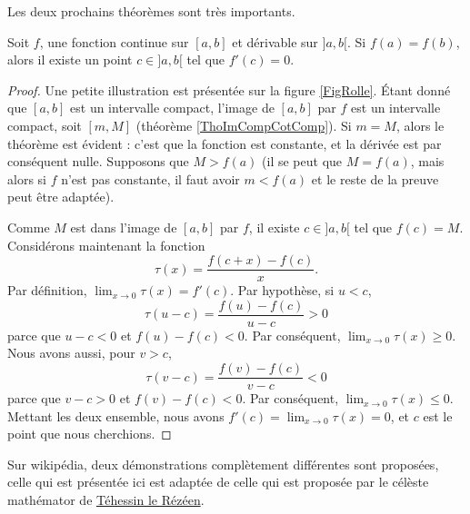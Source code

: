 Les deux prochains théorèmes sont très importants.
\begin{theorem}		\label{ThoRolle}
	Soit $f$, une fonction continue sur $[a,b]$ et dérivable sur $]a,b[$. Si $f(a)=f(b)$, alors il existe un point $c\in]a,b[$ tel que $f'(c)=0$.
\end{theorem}
\newcommand{\CaptionRolle}{Illustration du théorème de Rolle. Nous avons $f(a)=f(b)$, et effectivement, au point $c$, la tangente est horizonale (dérivée nulle).}


\begin{proof}
	Une petite illustration est présentée sur la figure \ref{FigRolle}.
	Étant donné que $[a,b]$ est un intervalle compact, l'image de $[a,b]$ par $f$ est un intervalle compact, soit $[m,M]$ (théorème \ref{ThoImCompCotComp}). Si $m=M$, alors le théorème est évident : c'est que la fonction est constante, et la dérivée est par conséquent nulle. Supposons que $M> f(a)$ (il se peut que $M=f(a)$, mais alors si $f$ n'est pas constante, il faut avoir $m<f(a)$ et le reste de la preuve peut être adaptée).

	Comme $M$ est dans l'image de $[a,b]$ par $f$, il existe $c\in ]a,b[$ tel que $f(c)=M$. Considérons maintenant la fonction
	\begin{equation}
		\tau(x) =\frac{ f(c+x)-f(c) }{ x }.
	\end{equation}
	Par définition, $\lim_{x\to 0}\tau(x)=f'(c)$. Par hypothèse, si $u<c$,
	\begin{equation}
		\tau(u-c) = \frac{ f(u)-f(c) }{ u-c }>0
	\end{equation}
	parce que $u-c<0$ et $f(u)-f(c)<0$. Par conséquent, $\lim_{x\to 0}\tau(x)\geq 0$. Nous avons aussi, pour $v>c$,
	\begin{equation}
		\tau(v-c) = \frac{ f(v)-f(c) }{ v-c }<0
	\end{equation}
	parce que $v-c>0$ et $f(v)-f(c)<0$. Par conséquent, $\lim_{x\to 0}\tau(x)\leq 0$. Mettant les deux ensemble, nous avons $f'(c)=\lim_{x\to 0}\tau(x)=0$, et $c$ est le point que nous cherchions.
\end{proof}

Sur wikipédia, deux démonstrations complètement différentes sont proposées, celle qui est présentée ici est adaptée de celle qui est proposée par le célèste mathémator de \href{http://gconnan.free.fr/les\%20pdf/Deriv.pdf}{Téhessin le Rézéen}.

